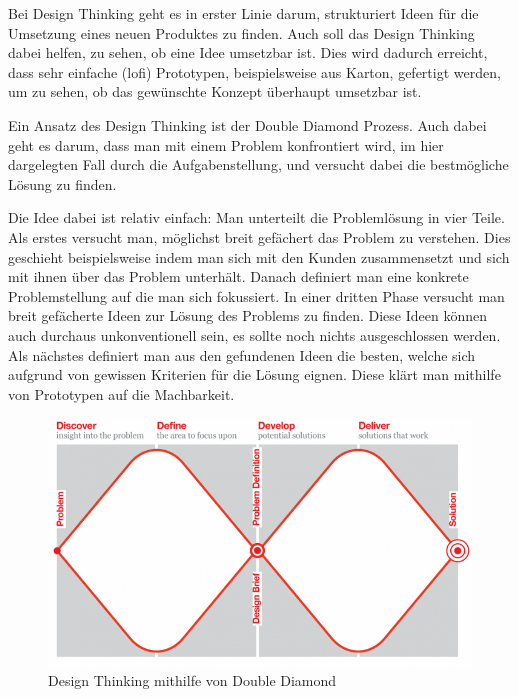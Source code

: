 Bei Design Thinking \cite{Wikipedia-Design-Thinking} geht es in erster Linie darum, strukturiert 
Ideen für die Umsetzung eines neuen Produktes zu finden. Auch soll das Design Thinking
dabei helfen, zu sehen, ob eine Idee umsetzbar ist. Dies wird dadurch erreicht,
dass sehr einfache (\acrshort{lofi}) Prototypen, beispielsweise aus Karton, 
gefertigt werden, um zu sehen, ob das gewünschte Konzept überhaupt umsetzbar ist.

Ein Ansatz des Design Thinking ist der Double Diamond Prozess. Auch dabei geht es
darum, dass man mit einem Problem konfrontiert wird, im hier dargelegten Fall durch die 
Aufgabenstellung, und versucht dabei die bestmögliche Lösung zu finden.

Die Idee dabei ist relativ einfach: Man unterteilt die Problemlösung in vier Teile.
Als erstes versucht man, möglichst breit gefächert das Problem zu verstehen. Dies geschieht
beispielsweise indem man sich mit den Kunden zusammensetzt und sich mit ihnen über das Problem unterhält.
Danach definiert man eine konkrete Problemstellung auf die man sich fokussiert.
In einer dritten Phase versucht man breit gefächerte Ideen zur Lösung des Problems zu finden.
Diese Ideen können auch durchaus unkonventionell sein, es sollte noch nichts ausgeschlossen werden.
Als nächstes definiert man aus den gefundenen Ideen
die besten, welche sich aufgrund von gewissen Kriterien für die Lösung eignen.
Diese klärt man mithilfe von Prototypen auf die Machbarkeit.
\begin{figure}[H]
  \includegraphics[width=1.0\textwidth]{img/double-diamond}
  \centering
  \caption{Design Thinking mithilfe von Double Diamond}
\end{figure}
  
